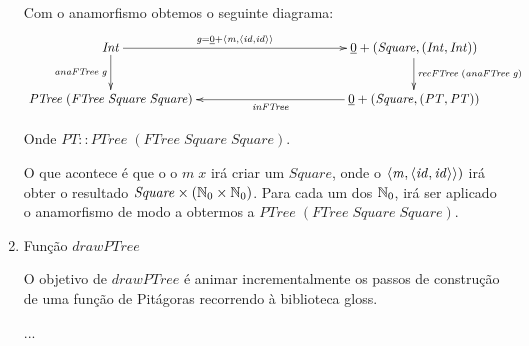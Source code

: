 \documentclass[a4paper]{article}
\newcommand{\Conid}[1]{\mathit{#1}}
\newcommand{\Varid}[1]{\mathit{#1}}
\begin{document}
\begin{enumerate}
Com o anamorfismo obtemos o seguinte diagrama:
\begin{eqnarray}
\xymatrix@C=4cm{
    \ensuremath{\Conid{Int}}
        \ar[d]_-{\ensuremath{\Varid{anaFTree}\;\Varid{g}}}
        \ar[r]^-{\ensuremath{\Varid{g}\mathrel{=}\underline{\mathrm{0}}\mathbin{+}\conj{\Varid{m}}{\conj{\Varid{id}}{\Varid{id}}}}}
&
    \ensuremath{\underline{\mathrm{0}}+(\Conid{Square},(\Conid{Int},\Conid{Int}))}
           \ar[d]^{\ensuremath{\Varid{recFTree}\;(\Varid{anaFTree}\;\Varid{g})}}
\\
     \ensuremath{\Conid{PTree}\;(\Conid{FTree}\;\Conid{Square}\;\Conid{Square})}
&
     \ensuremath{\underline{\mathrm{0}}+(\Conid{Square},(\Conid{PT},\Conid{PT}))}
           \ar[l]^-{\ensuremath{\Varid{inFTree}}}
}
\end{eqnarray}

Onde \ensuremath{\Conid{PT}\mathbin{::}\Conid{PTree}\;(\Conid{FTree}\;\Conid{Square}\;\Conid{Square})}.

O que acontece é que o o \ensuremath{\Varid{m}\;\Varid{x}} irá criar um \ensuremath{\Conid{Square}}, onde o \ensuremath{\conj{\Varid{m}}{\conj{\Varid{id}}{\Varid{id}}})}
irá obter o resultado \ensuremath{\Conid{Square}\times(\N_0\times\N_0)}. Para cada um dos \ensuremath{\N_0},
irá ser aplicado o anamorfismo de modo a obtermos a \ensuremath{\Conid{PTree}\;(\Conid{FTree}\;\Conid{Square}\;\Conid{Square})}.



\item Função \ensuremath{\Varid{drawPTree}}

O objetivo de \ensuremath{\Varid{drawPTree}} é animar incrementalmente os passos de construção de
uma função de Pitágoras recorrendo à biblioteca gloss.




...







\end{enumerate}
\end{document}
